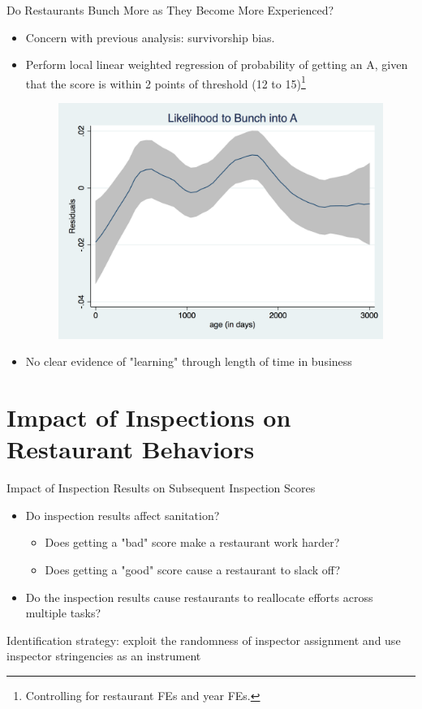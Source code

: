 \documentclass[handout]{beamer}
\begin{document}
\begin{frame}{Do Restaurants Bunch More as They Become More Experienced?}
\begin{itemize}
\item Concern with previous analysis: survivorship bias.
\item Perform local linear weighted regression of probability of getting an A, given that the score is within 2 points of threshold (12 to 15)\footnote{\tiny{Controlling for restaurant FEs and year FEs.}}
\begin{figure}
    \centering
    \includegraphics[scale = 0.2]{A_bunch_age.png}
\end{figure}
\item No clear evidence of "learning" through length of time in business
\end{itemize} 
\end{frame}
\fi
\section{Impact of Inspections on Restaurant Behaviors}
\begin{frame}{Impact of Inspection Results on Subsequent Inspection Scores}
\pause
    \begin{itemize}
        \item Do inspection results affect sanitation?
        \begin{itemize}
        \pause
        \item Does getting a "bad" score make a restaurant work harder?
        \item Does getting a "good" score cause a restaurant to slack off?
        \end{itemize}
        \pause
        \item Do the inspection results cause restaurants to reallocate efforts across multiple tasks?
    \end{itemize}
    \pause
    Identification strategy: exploit the randomness of inspector assignment and use inspector stringencies as an instrument
\end{frame}
\end{document}
